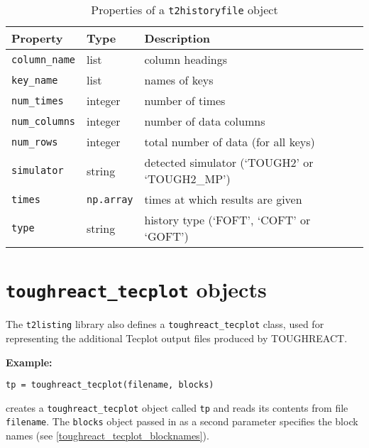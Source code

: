 \begin{table}
  \begin{center}
    \begin{tabular}{|l|l|l|}
      \hline
      \textbf{Property} & \textbf{Type} & \textbf{Description}\\
      \hline
      \texttt{column\_name} & list & column headings\\
      \texttt{key\_name} & list & names of keys\\
      \texttt{num\_times} & integer & number of times\\
      \texttt{num\_columns} & integer & number of data columns\\
      \texttt{num\_rows} & integer & total number of data (for all keys)\\
      \texttt{simulator} & string & detected simulator (`TOUGH2' or `TOUGH2\_MP')\\
      \texttt{times} & \texttt{np.array} & times at which results are given\\
      \texttt{type} & string & history type (`FOFT', `COFT' or `GOFT')\\
      \hline
    \end{tabular}
    \caption{Properties of a \texttt{t2historyfile} object}
    \label{tb:historyfile_properties}
  \end{center}
\end{table}

\section{\texttt{toughreact\_tecplot} objects}
\label{toughreact_tecplot}

The \texttt{t2listing} library also defines a \texttt{toughreact\_tecplot} class, used for representing the additional Tecplot output files produced by TOUGHREACT.

\textbf{Example:}

\begin{lstlisting}
tp = toughreact_tecplot(filename, blocks)
\end{lstlisting}

creates a \texttt{toughreact\_tecplot} object called \texttt{tp} and reads its contents from file \texttt{filename}. The \texttt{blocks} object passed in as a second parameter specifies the block names (see \ref{toughreact_tecplot_blocknames}).

